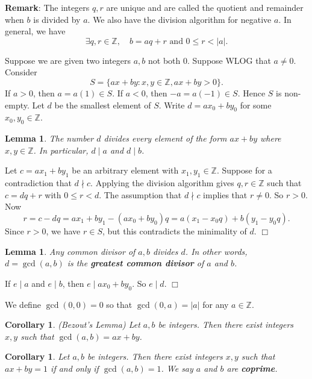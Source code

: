 \documentclass{article}
\def\Z{{\mathbb Z}}
\def\Z{{\mathbb Z}}
\newtheorem{cor}[subsection]{Corollary}
\newtheorem{lemma}[subsection]{Lemma}
\newenvironment{proof}{\noindent {\bf Proof:}}{$\Box$ \vspace{2 ex}}
\begin{document}
\noindent\textbf{Remark}: The integers $q,r$ are unique and are called the quotient and remainder when $b$ is divided by $a$. We also have the division algorithm for negative $a$. In general, we have
$$\exists q,r\in\Z,\quad b = aq + r \mbox{ and } 0\leq r < |a|.$$

Suppose we are given two integers $a,b$ not both $0$. Suppose WLOG that $a\neq 0$. Consider $$S = \{ax + by\colon x,y\in\Z, ax + by > 0\}.$$
If $a>0$, then $a = a(1)\in S$. If $a < 0$, then $-a = a(-1)\in S$. Hence $S$ is non-empty. Let $d$ be the smallest element of $S$. Write $d = ax_0 + by_0$ for some $x_0,y_0\in\Z$.

\begin{lemma}
    The number $d$ divides every element of the form $ax + by$ where $x,y\in\Z$. In particular, $d\mid a$ and $d\mid b$.
\end{lemma}

\begin{proof}
    Let $c = ax_1 + by_1$ be an arbitrary element with $x_1,y_1\in\Z$. Suppose for a contradiction that $d\nmid c$. Applying the division algorithm gives $q,r\in \Z$ such that $c = dq + r$ with $0\leq r < d$. The assumption that $d\nmid c$ implies that $r \neq 0$. So $r>0$. Now $$r = c - dq = ax_1 + by_1 - (ax_0 + by_0)q = a(x_1 - x_0q) + b(y_1-y_0q).$$
    Since $r>0$, we have $r\in S$, but this contradicts the minimality of $d$. 
\end{proof}

\begin{lemma}
    Any common divisor of $a,b$ divides $d$. In other words, $d = \gcd(a,b)$ is the \textbf{greatest common divisor} of $a$ and $b$.
\end{lemma}

\begin{proof}
    If $e\mid a$ and $e\mid b$, then $e\mid ax_0 + by_0$. So $e\mid d$.
\end{proof}

We define $\gcd(0,0) = 0$ so that $\gcd(0,a) = |a|$ for any $a\in\Z$.

\begin{cor}
    (Bezout's Lemma) Let $a,b$ be integers. Then there exist integers $x,y$ such that $\gcd(a,b) = ax + by$. 
\end{cor}



\begin{cor}
    Let $a,b$ be integers. Then there exist integers $x,y$ such that $ax + by = 1$ if and only if $\gcd(a,b) = 1$. We say $a$ and $b$ are \textbf{coprime}.
\end{cor}
\end{document}
